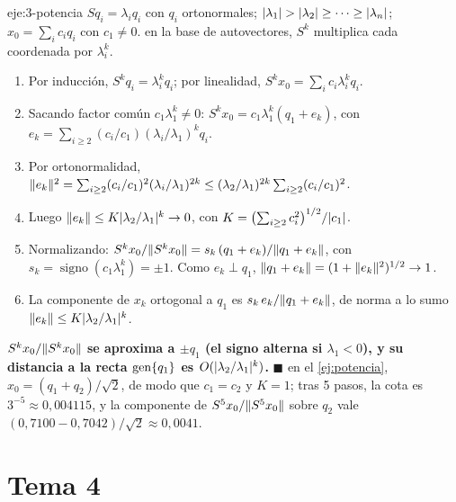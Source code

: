 \begin{solucion}{eje:3-potencia}
\datos $Sq_i=\lambda_iq_i$ con $q_i$ ortonormales; $\lvert\lambda_1\rvert>\lvert\lambda_2\rvert\ge\dots\ge\lvert\lambda_n\rvert$; $x_0=\sum_ic_iq_i$ con $c_1\ne 0$.
\planteamiento en la base de autovectores, $S^{k}$ multiplica cada coordenada por $\lambda_i^{k}$.
\pasos
\begin{enumerate}[label=\arabic*.]
  \item Por inducción, $S^{k}q_i=\lambda_i^{k}q_i$; por linealidad, $S^{k}x_0=\sum_ic_i\lambda_i^{k}q_i$.
  \item Sacando factor común $c_1\lambda_1^{k}\ne 0$: $S^{k}x_0=c_1\lambda_1^{k}(q_1+e_k)$, con $e_k=\sum_{i\ge 2}(c_i/c_1)(\lambda_i/\lambda_1)^{k}q_i$.
  \item Por ortonormalidad, $\lVert e_k\rVert^{2}=\sum_{i\ge 2}(c_i/c_1)^{2}(\lambda_i/\lambda_1)^{2k}\le(\lambda_2/\lambda_1)^{2k}\sum_{i\ge 2}(c_i/c_1)^{2}$.
  \item Luego $\lVert e_k\rVert\le K\lvert\lambda_2/\lambda_1\rvert^{k}\to 0$, con $K=\bigl(\sum_{i\ge 2}c_i^{2}\bigr)^{1/2}/\lvert c_1\rvert$.
  \item Normalizando: $S^{k}x_0/\lVert S^{k}x_0\rVert=s_k\,(q_1+e_k)/\lVert q_1+e_k\rVert$, con $s_k=\operatorname{signo}(c_1\lambda_1^{k})=\pm 1$. Como $e_k\perp q_1$, $\lVert q_1+e_k\rVert=(1+\lVert e_k\rVert^{2})^{1/2}\to 1$.
  \item La componente de $x_k$ ortogonal a $q_1$ es $s_k\,e_k/\lVert q_1+e_k\rVert$, de norma a lo sumo $\lVert e_k\rVert\le K\lvert\lambda_2/\lambda_1\rvert^{k}$.
\end{enumerate}
\resultado \textbf{$S^{k}x_0/\lVert S^{k}x_0\rVert$ se aproxima a $\pm q_1$ (el signo alterna si $\lambda_1<0$), y su distancia a la recta $\operatorname{gen}\{q_1\}$ es $O(\lvert\lambda_2/\lambda_1\rvert^{k})$.} \hfill$\blacksquare$
\comprobacion en el \cref{ej:potencia}, $x_0=(q_1+q_2)/\sqrt{2}$, de modo que $c_1=c_2$ y $K=1$; tras 5 pasos, la cota es $3^{-5}\approx 0{,}004115$, y la componente de $S^{5}x_0/\lVert S^{5}x_0\rVert$ sobre $q_2$ vale $(0{,}7100-0{,}7042)/\sqrt{2}\approx 0{,}0041$.
\end{solucion}

\section{Tema 4}

